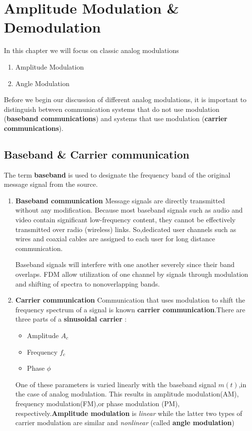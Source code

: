 \chapter{Amplitude Modulation \& Demodulation}
In this chapter we will focus on classic analog modulations
\begin{enumerate}
  \item Amplitude Modulation
  \item Angle Modulation
\end{enumerate}
Before we begin our discussion of different analog modulations, it is important to distinguish between communication systems that do not use modulation (\textbf{baseband communications}) and systems that use modulation (\textbf{carrier communications}).

\section{Baseband \& Carrier communication}
The term \textbf{baseband} is used to designate the frequency band of the original message signal from the source.
\begin{enumerate}
  \item \textbf{Baseband communication}
  \newline
  Message signals are directly transmitted without any modification. Because most baseband signals such as audio and video contain significant low-frequency content, they cannot be effectively transmitted over radio (wireless) links. So,dedicated user channels such as wires and coaxial cables are assigned to each user for long distance communication.
  \par Baseband signals will interfere with one another severely since their band overlaps. FDM allow utilization of one channel by signals through modulation and shifting of spectra to nonoverlapping bands.

  \item \textbf{Carrier communication}
  \newline
  Communication that uses modulation to shift the frequency spectrum of a signal is known \textbf{carrier communication}.There are three parts of a \textbf{sinusoidal carrier} :
  \begin{itemize}
    \item Amplitude $A_c$
    \item Frequency $f_c$
    \item Phase $\phi$
  \end{itemize}
  One of these parameters is varied linearly with the baseband signal $m(t)$,in the case of analog modulation. This results in amplitude modulation(AM), frequency modulation(FM),or phase modulation (PM), respectively.\textbf{Amplitude modulation} is \textit{linear} while the latter two types of carrier modulation are similar and \textit{nonlinear} (called \textbf{angle modulation})
\end{enumerate}


